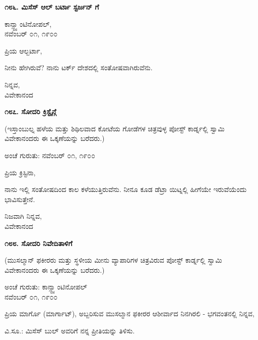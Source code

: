 \begin{center}
\textbf{೧೮೬. ಮಿಸೆಸ್ ಆಲ್ ಬರ್ಟಾ ಸ್ಟರ್ಜನ್ ಗೆ}
\end{center}

\begin{flushright}
ಕಾನ್ಸ್ಟ್ಯಾಂಟಿನೋಪಲ್,\\ನವೆಂಬರ್ ೦೧, ೧೯೦೦
\end{flushright}

ಪ್ರಿಯ ಆಲ್ಬರ್ಟಾ,

ನೀನು ಹೇಗಿರುವೆ? ನಾನು ಟರ್ಕ್ ದೇಶದಲ್ಲಿ ಸಂತೋಷವಾಗಿರುವೆನು.

\begin{flushright}
ನಿನ್ನವ,\\ವಿವೇಕಾನಂದ
\end{flushright}

\begin{center}
\textbf{೧೮೭. ಸೋದರಿ ಕ್ರಿಸ್ಟೈನ್ಗೆ}
\end{center}

(ಇಸ್ತಾಂಬುಲ್ನ ಹಳೆಯ ಮತ್ತು ಶಿಥಿಲವಾದ ಕೋಟೆಯ ಗೋಡೆಗಳ ಚಿತ್ರವುಳ್ಳ ಪೋಸ್ಟ್ ಕಾರ್ಡ್ನಲ್ಲಿ ಸ್ವಾಮಿ ವಿವೇಕಾನಂದರು ಈ ಒಕ್ಕಣೆಯನ್ನು ಬರೆದರು.)

\begin{flushright}
ಅಂಚೆ ಗುರುತು: ನವೆಂಬರ್ ೦೧, ೧೯೦೦
\end{flushright}

ಪ್ರಿಯ ಕ್ರಿಸ್ಟಿನಾ,

ನಾನು ಇಲ್ಲಿ ಸಂತೋಷದಿಂದ ಕಾಲ ಕಳೆಯುತ್ತಿರುವೆನು. ನೀನೂ ಕೂಡ ಡೆಟ್ರಾ ಯಿಟ್ನಲ್ಲಿ ಹೀಗೆಯೇ ಇರುವೆಯೆಂದು ಭಾವಿಸುತ್ತೇನೆ.

\begin{flushright}
ನಿಜವಾಗಿ ನಿನ್ನವ,\\ವಿವೇಕಾನಂದ
\end{flushright}

\begin{center}
\textbf{೧೮೮. ಸೋದರಿ ನಿವೇದಿತಾಳಿಗೆ}
\end{center}

\begin{flushright}
(ಮುಸಲ್ಮಾನ್ ಫಕೀರರು ಮತ್ತು ಸ್ಥಳೀಯ ಮೀನು ವ್ಯಾಪಾರಿಗಳ ಚಿತ್ರವಿರುವ ಪೋಸ್ಟ್ ಕಾರ್ಡ್ನಲ್ಲಿ ಸ್ವಾಮಿ ವಿವೇಕಾನಂದರು ಈ ಒಕ್ಕಣೆಯನ್ನು ಬರೆದರು.)
\end{flushright}

\begin{flushright}
ಅಂಚೆ ಗುರುತು: ಕಾನ್ಸ್ಟ್ಯಾಂಟಿನೋಪಲ್\\ನವೆಂಬರ್ ೦೧, ೧೯೦೦
\end{flushright}

ಪ್ರಿಯ ಮಾರ್ಗೊ (ಮಾರ್ಗಾಟ್), ಅಬ್ಬರಿಸುವ ಮುಸಲ್ಮಾನ ಫಕೀರರ ಆಶೀರ್ವಾದ ನಿನಗಿರಲಿ - ಭಗವಂತನಲ್ಲಿ ನಿನ್ನವ,

ವಿ.ಸೂ.: ಮಿಸೆಸ್ ಬುಲ್ ಅವರಿಗೆ ನನ್ನ ಪ್ರೀತಿಯನ್ನು ತಿಳಿಸು.

